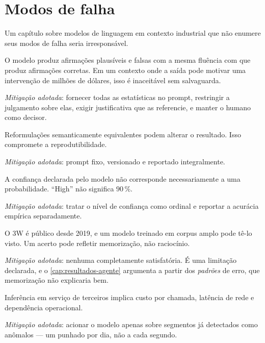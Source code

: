 \section{Modos de falha}

Um capítulo sobre modelos de linguagem em contexto industrial que não enumere seus modos
de falha seria irresponsável.

\begin{description}[leftmargin=0pt,style=nextline,itemsep=0.5em]

\item[Alucinação.] O modelo produz afirmações plausíveis e falsas com a mesma fluência
com que produz afirmações corretas. Em um contexto onde a saída pode motivar uma
intervenção de milhões de dólares, isso é inaceitável sem salvaguarda.

\emph{Mitigação adotada}: fornecer todas as estatísticas no prompt, restringir a
julgamento sobre elas, exigir justificativa que as referencie, e manter o humano como
decisor.

\item[Sensibilidade ao prompt.] Reformulações semanticamente equivalentes podem alterar
o resultado. Isso compromete a reprodutibilidade.

\emph{Mitigação adotada}: prompt fixo, versionado e reportado integralmente.

\item[Ausência de calibração.] A confiança declarada pelo modelo não corresponde
necessariamente a uma probabilidade. ``High'' não significa $90\,\%$.

\emph{Mitigação adotada}: tratar o nível de confiança como ordinal e reportar a acurácia
empírica separadamente.

\item[Contaminação de dados.] O 3W é público desde 2019, e um modelo treinado em corpus
amplo pode tê-lo visto. Um acerto pode refletir memorização, não raciocínio.

\emph{Mitigação adotada}: nenhuma completamente satisfatória. É uma limitação declarada,
e o \cref{cap:resultados-agente} argumenta a partir dos \emph{padrões} de erro, que
memorização não explicaria bem.

\item[Custo e dependência externa.] Inferência em serviço de terceiros implica custo por
chamada, latência de rede e dependência operacional.

\emph{Mitigação adotada}: acionar o modelo apenas sobre segmentos já detectados como
anômalos --- um punhado por dia, não a cada segundo.

\end{description}

